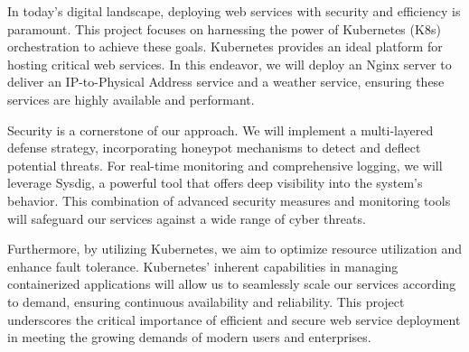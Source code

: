 In today's digital landscape, deploying web services with security and efficiency is paramount. This project focuses on harnessing the power of Kubernetes (K8s) orchestration to achieve these goals. Kubernetes provides an ideal platform for hosting critical web services. In this endeavor, we will deploy an Nginx server to deliver an IP-to-Physical Address service and a weather service, ensuring these services are highly available and performant.

Security is a cornerstone of our approach. We will implement a multi-layered defense strategy, incorporating honeypot mechanisms to detect and deflect potential threats. For real-time monitoring and comprehensive logging, we will leverage Sysdig, a powerful tool that offers deep visibility into the system's behavior. This combination of advanced security measures and monitoring tools will safeguard our services against a wide range of cyber threats.

Furthermore, by utilizing Kubernetes, we aim to optimize resource utilization and enhance fault tolerance. Kubernetes’ inherent capabilities in managing containerized applications will allow us to seamlessly scale our services according to demand, ensuring continuous availability and reliability. This project underscores the critical importance of efficient and secure web service deployment in meeting the growing demands of modern users and enterprises.